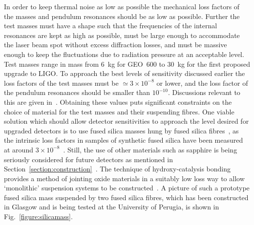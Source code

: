 \documentclass{article}
\begin{document}
In order to keep thermal noise as low as possible the mechanical
loss factors of the masses and pendulum resonances should be as
low as possible. Further the test masses must have a shape such that
the frequencies of the internal resonances are kept as high as
possible, must be large enough to accommodate the laser beam spot
without excess diffraction losses, and must be massive enough to keep
the fluctuations due to radiation pressure at an acceptable level. Test
masses range in mass from 6~kg for GEO~600 to 30~kg for the first
proposed upgrade to LIGO. To approach the best levels of sensitivity
discussed earlier the loss factors of the test masses must be $\simeq
3 \times 10^{-8}$ or lower, and the loss factor of the pendulum
resonances should be smaller than $10^{-10}$. Discussions relevant to
this are given in~\cite{Rowan1, RowanTAMA}. Obtaining these values
puts significant constraints on the choice of material for the test
masses and their suspending fibres. One viable solution which should
allow detector sensitivities to approach the level desired for
upgraded detectors is to use fused silica masses hung by fused silica
fibres~\cite{Braginsky1, Rowan2}, as the intrinsic loss factors in
samples of synthetic fused silica have been measured at around $3
\times 10^{-8}$~\cite{Lunin, Startin}. Still, the use of other
materials such as sapphire is being seriously considered for future
detectors as mentioned in
Section~\ref{section:construction}~\cite{Braginsky2, Ju2, Rowan1}. The
technique of hydroxy-catalysis bonding provides a method of jointing
oxide materials in a suitably low loss way to allow `monolithic'
suspension systems to be constructed~\cite{Rowan3}. A picture of such
a prototype fused silica mass suspended by two fused silica fibres,
which has been constructed in Glasgow and is being tested at the
University of Perugia, is shown in Fig.~\ref{figure:silicamass}.

\end{document}
